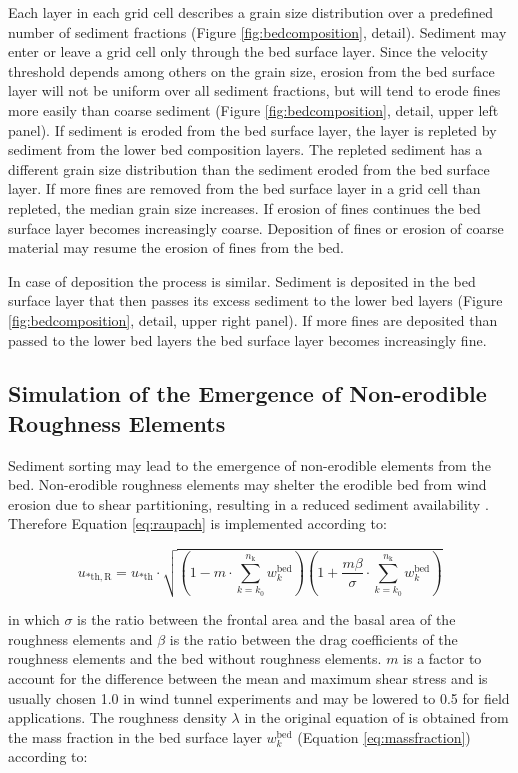 Each layer in each grid cell describes a grain size distribution over
a predefined number of sediment fractions (Figure
\ref{fig:bedcomposition}, detail). Sediment may enter or leave a grid
cell only through the bed surface layer. Since the velocity threshold
depends among others on the grain size, erosion from the bed surface
layer will not be uniform over all sediment fractions, but will tend
to erode fines more easily than coarse sediment (Figure
\ref{fig:bedcomposition}, detail, upper left panel). If sediment is
eroded from the bed surface layer, the layer is repleted by sediment
from the lower bed composition layers. The repleted sediment has a
different grain size distribution than the sediment eroded from the
bed surface layer. If more fines are removed from the bed surface
layer in a grid cell than repleted, the median grain size
increases. If erosion of fines continues the bed surface layer becomes
increasingly coarse. Deposition of fines or erosion of coarse material
may resume the erosion of fines from the bed.

In case of deposition the process is similar. Sediment is deposited in
the bed surface layer that then passes its excess sediment to the
lower bed layers (Figure \ref{fig:bedcomposition}, detail, upper right
panel). If more fines are deposited than passed to the lower bed
layers the bed surface layer becomes increasingly fine.

\subsection{Simulation of the Emergence of Non-erodible Roughness
  Elements} \label{sec:roughness}

Sediment sorting may lead to the emergence of non-erodible elements
from the bed. Non-erodible roughness elements may shelter the
erodible bed from wind erosion due to shear partitioning, resulting in
a reduced sediment availability \citep{Raupach1993}. Therefore
Equation \ref{eq:raupach} is implemented according to:

\begin{equation} \label{eq:raupach2}
u_{\mathrm{* th, R}} = u_{\mathrm{* th}} \cdot \sqrt{ \left( 1 - m \cdot \sum_{k=k_0}^{n_{\mathrm{k}}}{w_k^{\mathrm{bed}}} \right) \left( 1 + \frac{m \beta}{\sigma} \cdot \sum_{k=k_0}^{n_{\mathrm{k}}}{w_k^{\mathrm{bed}}} \right) }
\end{equation}

\noindent in which $\sigma$ is the ratio between the frontal area and
the basal area of the roughness elements and $\beta$ is the ratio
between the drag coefficients of the roughness elements and the bed
without roughness elements. $m$ is a factor to account for the
difference between the mean and maximum shear stress and is usually
chosen 1.0 in wind tunnel experiments and may be lowered to 0.5 for
field applications. The roughness density $\lambda$ in the original
equation of \citet[][Equation \ref{eq:raupach}]{Raupach1993} is
obtained from the mass fraction in the bed surface layer $w_k^{\mathrm{bed}}$
(Equation \ref{eq:massfraction}) according to:

